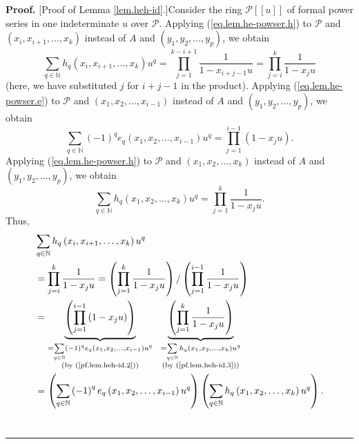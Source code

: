 \documentclass[numbers=enddot,12pt,final,onecolumn,notitlepage]{scrartcl}%
\theoremstyle{definition}
\newenvironment{proof}[1][Proof]{\noindent\textbf{#1.} }{\ \rule{0.5em}{0.5em}}
\let\sumnonlimits\sum
\let\prodnonlimits\prod
\renewcommand{\sum}{\sumnonlimits\limits}
\renewcommand{\prod}{\prodnonlimits\limits}
\begin{document}
\begin{proof}
[Proof of Lemma \ref{lem.heh-id}.]Consider the ring $\mathcal{P}\left[
\left[  u\right]  \right]  $ of formal power series in one indeterminate $u$
over $\mathcal{P}$. Applying (\ref{eq.lem.he-powser.h}) to $\mathcal{P}$ and
$\left(  x_{i},x_{i+1},\ldots,x_{k}\right)  $ instead of $A$ and $\left(
y_{1},y_{2},\ldots,y_{p}\right)  $, we obtain%
\[
\sum_{q\in\mathbb{N}}h_{q}\left(  x_{i},x_{i+1},\ldots,x_{k}\right)
u^{q}=\prod_{j=1}^{k-i+1}\dfrac{1}{1-x_{i+j-1}u}=\prod_{j=i}^{k}\dfrac
{1}{1-x_{j}u}%
\]
(here, we have substituted $j$ for $i+j-1$ in the product). Applying
(\ref{eq.lem.he-powser.e}) to $\mathcal{P}$ and $\left(  x_{1},x_{2}%
,\ldots,x_{i-1}\right)  $ instead of $A$ and $\left(  y_{1},y_{2},\ldots
,y_{p}\right)  $, we obtain%
\begin{equation}
\sum_{q\in\mathbb{N}}\left(  -1\right)  ^{q}e_{q}\left(  x_{1},x_{2}%
,\ldots,x_{i-1}\right)  u^{q}=\prod_{j=1}^{i-1}\left(  1-x_{j}u\right)  .
\label{pf.lem.heh-id.2}%
\end{equation}
Applying (\ref{eq.lem.he-powser.h}) to $\mathcal{P}$ and $\left(  x_{1}%
,x_{2},\ldots,x_{k}\right)  $ instead of $A$ and $\left(  y_{1},y_{2}%
,\ldots,y_{p}\right)  $, we obtain
\begin{equation}
\sum_{q\in\mathbb{N}}h_{q}\left(  x_{1},x_{2},\ldots,x_{k}\right)  u^{q}%
=\prod_{j=1}^{k}\dfrac{1}{1-x_{j}u}. \label{pf.lem.heh-id.3}%
\end{equation}
Thus,
\begin{align*}
&  \sum_{q\in\mathbb{N}}h_{q}\left(  x_{i},x_{i+1},\ldots,x_{k}\right)
u^{q}\\
&  =\prod_{j=i}^{k}\dfrac{1}{1-x_{j}u}=\left(  \prod_{j=1}^{k}\dfrac
{1}{1-x_{j}u}\right)  /\left(  \prod_{j=1}^{i-1}\dfrac{1}{1-x_{j}u}\right) \\
&  =\underbrace{\left(  \prod_{j=1}^{i-1}\left(  1-x_{j}u\right)  \right)
}_{\substack{=\sum_{q\in\mathbb{N}}\left(  -1\right)  ^{q}e_{q}\left(
x_{1},x_{2},\ldots,x_{i-1}\right)  u^{q}\\\text{(by (\ref{pf.lem.heh-id.2}))}%
}}\ \ \underbrace{\left(  \prod_{j=1}^{k}\dfrac{1}{1-x_{j}u}\right)
}_{\substack{=\sum_{q\in\mathbb{N}}h_{q}\left(  x_{1},x_{2},\ldots
,x_{k}\right)  u^{q}\\\text{(by (\ref{pf.lem.heh-id.3}))}}}\\
&  =\left(  \sum_{q\in\mathbb{N}}\left(  -1\right)  ^{q}e_{q}\left(
x_{1},x_{2},\ldots,x_{i-1}\right)  u^{q}\right)  \left(  \sum_{q\in\mathbb{N}%
}h_{q}\left(  x_{1},x_{2},\ldots,x_{k}\right)  u^{q}\right)  .

\end{align*}
\end{proof}
\end{document}
